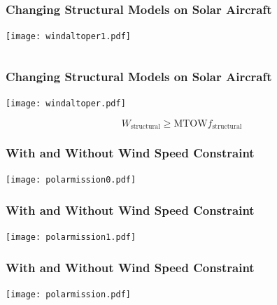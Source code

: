 \documentclass{beamer}
\begin{document}
\begin{frame}
    \frametitle{Changing Structural Models on Solar Aircraft}


    \begin{center}
    \texttt{[image: windaltoper1.pdf]} \\
    \end{center}
    
    \[ \]

\end{frame}

\begin{frame}
    \frametitle{Changing Structural Models on Solar Aircraft}


    \begin{center}
    \texttt{[image: windaltoper.pdf]} \\
    \end{center}
    
    \[ W_{\text{structural}} \geq \text{MTOW} f_{\text{structural}} \]

\end{frame}

\begin{frame}
    \frametitle{With and Without Wind Speed Constraint}

    \begin{center}
    \texttt{[image: polarmission0.pdf]} \\
    \end{center}

\end{frame}

\begin{frame}
    \frametitle{With and Without Wind Speed Constraint}

    \begin{center}
    \texttt{[image: polarmission1.pdf]} \\
    \end{center}

\end{frame}

\begin{frame}
    \frametitle{With and Without Wind Speed Constraint}

    \begin{center}
    \texttt{[image: polarmission.pdf]} \\
    \end{center}

\end{frame}
\end{document}
